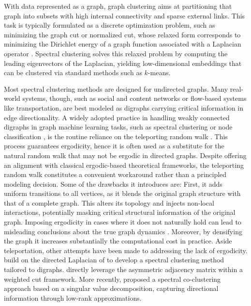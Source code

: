 \documentclass[10pt]{article} %
\begin{document}
With data represented as a graph, graph clustering aims at partitioning that graph into subsets with high internal connectivity and sparse external links. This task is typically formulated as a discrete optimization problem, such as minimizing the graph cut or normalized cut, whose relaxed form corresponds to minimizing the Dirichlet energy of a graph function associated with a Laplacian operator \citep{von2007tutorial, shi2000normalized}. Spectral clustering solves this relaxed problem by computing the leading eigenvectors of the Laplacian, yielding low-dimensional embeddings that can be clustered via standard methods such as $k$-means.

%

Most spectral clustering methods are designed for undirected graphs. Many real-world systems, though, such as social and content networks or flow-based systems like transportation, are best modeled as digraphs carrying critical information in edge directionality.
A widely adopted practice in handling weakly connected digraphs in graph machine learning tasks, such as spectral clustering \citep{zhou2005learning} or node classification \citep{peach2019semi}, is the routine reliance on the teleporting random walk \citep{page1999pagerank}. This process guarantees ergodicity, hence it is often used as a substitute for the natural random walk that may not be ergodic in directed graphs. Despite offering an alignment with classical ergodic-based theoretical frameworks, the teleporting random walk constitutes a convenient workaround rather than a principled modeling decision. Some of the drawbacks it introduces are: First, it adds uniform transitions to all vertices, as it blends the original graph structure with that of a complete graph. This alters its topology and injects non-local interactions, potentially masking critical structural information of the original graph. Imposing ergodicity in cases where it does not naturally hold can lead to misleading conclusions about the true graph dynamics \citep{schaub2019multiscale}. Moreover, by densifying the graph it increases substantially the computational cost in practice. Aside teleportation, other attempts have been made to addressing the lack of ergodicity. \citet{zhou2005learning} build on the directed Laplacian of \citet{chung2005laplacians} to develop a spectral clustering method tailored to digraphs. \citet{meilua2007clustering} directly leverage the asymmetric adjacency matrix within a weighted cut framework. More recently, \citet{rohe2016co} proposed a spectral co-clustering approach based on a singular value decomposition, capturing directional information through low-rank approximations.
\end{document}
